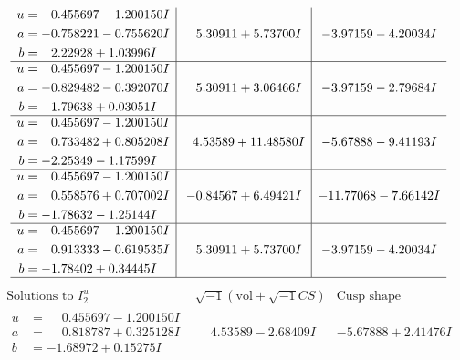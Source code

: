 \documentclass[1p]{elsarticle_modified}
\theoremstyle{definition}
\newcommand{\I}{\sqrt{-1}}
\begin{document}
$$\begin{array}{c|c|c}
\begin{aligned}
u &= \phantom{-}0.455697 - 1.200150 I \\
a &= -0.758221 - 0.755620 I \\
b &= \phantom{-}2.22928 + 1.03996 I\end{aligned}
 & \phantom{-}5.30911 + 5.73700 I & -3.97159 - 4.20034 I \\ \hline\begin{aligned}
u &= \phantom{-}0.455697 - 1.200150 I \\
a &= -0.829482 - 0.392070 I \\
b &= \phantom{-}1.79638 + 0.03051 I\end{aligned}
 & \phantom{-}5.30911 + 3.06466 I & -3.97159 - 2.79684 I \\ \hline\begin{aligned}
u &= \phantom{-}0.455697 - 1.200150 I \\
a &= \phantom{-}0.733482 + 0.805208 I \\
b &= -2.25349 - 1.17599 I\end{aligned}
 & \phantom{-}4.53589 + 11.48580 I & -5.67888 - 9.41193 I \\ \hline\begin{aligned}
u &= \phantom{-}0.455697 - 1.200150 I \\
a &= \phantom{-}0.558576 + 0.707002 I \\
b &= -1.78632 - 1.25144 I\end{aligned}
 & -0.84567 + 6.49421 I & -11.77068 - 7.66142 I \\ \hline\begin{aligned}
u &= \phantom{-}0.455697 - 1.200150 I \\
a &= \phantom{-}0.913333 - 0.619535 I \\
b &= -1.78402 + 0.34445 I\end{aligned}
 & \phantom{-}5.30911 + 5.73700 I & -3.97159 - 4.20034 I\\
 \hline 
 \end{array}$$\newpage$$\begin{array}{c|c|c}  
\text{Solutions to }I^u_{2}& \I (\text{vol} + \sqrt{-1}CS) & \text{Cusp shape}\\
 \hline 
\begin{aligned}
u &= \phantom{-}0.455697 - 1.200150 I \\
a &= \phantom{-}0.818787 + 0.325128 I \\
b &= -1.68972 + 0.15275 I\end{aligned}
 & \phantom{-}4.53589 - 2.68409 I & -5.67888 + 2.41476 I \\ \hline\begin{aligned}

\end{aligned}
\end{array}$$
\end{document}
